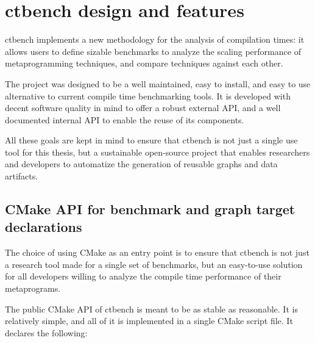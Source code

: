 \documentclass[../main]{subfiles}
\begin{document}
\section{
  ctbench design and features
}

ctbench implements a new methodology for the analysis of compilation times:
it allows users to define \cpp sizable benchmarks to analyze the scaling
performance of \cpp metaprogramming techniques, and compare techniques
against each other.

The project was designed to be a well maintained, easy to install,
and easy to use alternative to current compile time benchmarking tools.
It is developed with decent software quality in mind to offer a robust
external API, and a well documented internal API to enable the reuse of
its components.

All these goals are kept in mind to ensure that ctbench is not just a single
use tool for this thesis, but a sustainable open-source project that enables
researchers and developers to automatize the generation of reusable graphs
and data artifacts.

\subsection{
  CMake API for benchmark and graph target declarations
}
\label{lbl:ctbench-cmake-api}

The choice of using CMake as an entry point is to ensure that ctbench is not
just a research tool made for a single set of benchmarks, but an easy-to-use
solution for all \cpp developers willing to analyze the compile time
performance of their metaprograms.

The public CMake API of ctbench is meant to be as stable as reasonable.
It is relatively simple, and all of it is implemented in
a single CMake script file. It declares the following:
\end{document}
